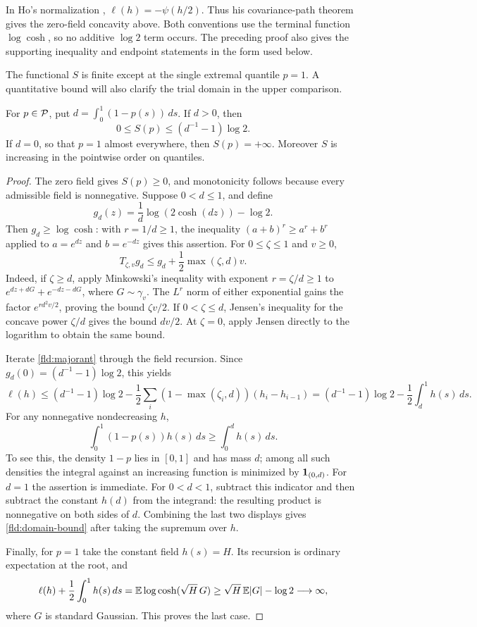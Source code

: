 In Ho's normalization \cite[Theorem~1.8]{Ho2026},
$\ell(h)=-\psi(h/2)$. Thus his covariance-path theorem gives the
zero-field concavity above. Both conventions use the terminal function
$\log\cosh$, so no additive $\log2$ term occurs. The preceding proof
also gives the supporting inequality and endpoint statements in the form
used below.

The functional $S$ is finite except at the single extremal quantile
$p=1$. A quantitative bound will also clarify the trial domain in the
upper comparison.

\begin{lemma}\label{fld:domain}
For $p\in\mathcal P$, put $d=\int_0^1(1-p(s))\,ds$. If $d>0$, then
\begin{equation}\label{fld:domain-bound}
 0\leq S(p)\leq(d^{-1}-1)\log2.
\end{equation}
If $d=0$, so that $p=1$ almost everywhere, then $S(p)=+\infty$.
Moreover $S$ is increasing in the pointwise order on quantiles.
\end{lemma}

\begin{proof}
The zero field gives $S(p)\geq0$, and monotonicity follows because
every admissible field is nonnegative. Suppose $0<d\leq1$, and define
\[
 g_d(z)=\frac1d\log(2\cosh(dz))-\log2.
\]
Then $g_d\geq\log\cosh$: with $r=1/d\geq1$, the inequality
$(a+b)^r\geq a^r+b^r$ applied to $a=e^{dz}$ and $b=e^{-dz}$ gives
this assertion. For $0\leq\zeta\leq1$ and $v\geq0$,
\begin{equation}\label{fld:majorant}
 T_{\zeta,v}g_d\leq g_d+\frac12\max(\zeta,d)v.
\end{equation}
Indeed, if $\zeta\geq d$, apply Minkowski's inequality with exponent
$r=\zeta/d\geq1$ to
$e^{dz+dG}+e^{-dz-dG}$, where $G\sim\gamma_v$.
The $L^r$ norm of either exponential gains the factor
$e^{rd^2v/2}$, proving the bound $\zeta v/2$. If
$0<\zeta\leq d$, Jensen's inequality for the concave power
$\zeta/d$ gives the bound $dv/2$. At $\zeta=0$, apply Jensen directly
to the logarithm to obtain the same bound.

Iterate \eqref{fld:majorant} through the field recursion. Since
$g_d(0)=(d^{-1}-1)\log2$, this yields
\[
 \ell(h)\leq(d^{-1}-1)\log2
 -\frac12\sum_i(1-\max(\zeta_i,d))(h_i-h_{i-1})
 =(d^{-1}-1)\log2-\frac12\int_d^1h(s)\,ds.
\]
For any nonnegative nondecreasing $h$,
\[
 \int_0^1(1-p(s))h(s)\,ds\geq\int_0^d h(s)\,ds.
\]
To see this, the density $1-p$ lies in $[0,1]$ and has mass $d$;
among all such densities the integral against an increasing function
is minimized by $\mathbf 1_{(0,d)}$. For $d=1$ the assertion is immediate.
For $0<d<1$, subtract this indicator and then subtract the constant
$h(d)$ from the integrand: the resulting product is nonnegative on both
sides of $d$. Combining the last two
displays gives \eqref{fld:domain-bound} after taking the supremum over
$h$.

Finally, for $p=1$ take the constant field $h(s)=H$. Its recursion is
ordinary expectation at the root, and
\[
 \ell(h)+\frac12\int_0^1h(s)\,ds
 =\mathbb E\log\cosh(\sqrt H\,G)
 \geq\sqrt H\,\mathbb E|G|-\log2\longrightarrow\infty,
\]
where $G$ is standard Gaussian. This proves the last case.
\end{proof}
